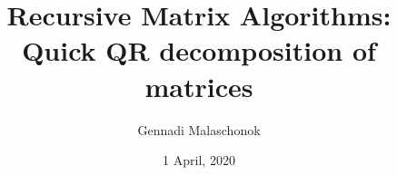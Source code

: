 \documentclass[pdf]{beamer}
\begin{document}
\newtheorem{sentence}{Sentence}
\newtheorem{follow}{Corollary}
\newtheorem{consequence}{Consequence}
\newcommand{\bP}{{\mathbf P}}
\newtheorem{myProperty}{Property}
\newcommand{\bQ}{{\mathbf Q}}
\newcommand{\bR}{{\mathbf R}}
\newcommand{\bL}{{\mathbf L}}
\newcommand{\bM}{{\mathbf M}}
\newcommand{\bU}{{\mathbf U}}
\newcommand{\bA}{{\mathbf A}}
\newcommand{\bB}{{\mathbf B}}
\newcommand{\bC}{{\mathbf C}}
\newcommand{\bD}{{\mathbf D}}
\newcommand{\bd}{{\mathbf d}}
\newcommand{\bl}{{\mathbf l}}
\newcommand{\bu}{{\mathbf u}}
\newcommand{\bp}{{\mathbf p}}
\newcommand{\bq}{{\mathbf q}}
\newcommand{\bm}{{\mathbf m}}
\newcommand{\bw}{{\mathbf w}}
\newcommand{\bW}{{\mathbf W}}


\newcommand{\Dmtr}[4]%
{\left|\begin{array}{rr}#1 & #2\\#3 & #4\end{array}\right|}
\def\cA{{\bf \mathcal A}}
\def\cB{{\bf \mathcal B}}
\def\cC{{\bf \mathcal C}}
\def\cD{{\bf \mathcal D}}
\newcommand{\LDU}{{\mathrm{LDU}}}
\newcommand{\Adj}{{\mathrm{Adj}}}
\newcommand{\diag}{{\mathrm{diag}}}
\newcommand{\rank}{{\mathrm{rank}}}
\def\al{{\alpha}}
\def\be{\beta}
\def\de{\delta}
\def\ve{\varepsilon}
\def\si{\sigma}
\def\ga{\gamma}
\def\di{{\bf {\rm diag}}}
\def\De{\Delta}
\def\G{\Gamma}
\def\cA{{\bf \mathcal A}}
\def\cU{{\bf \mathcal U}}
\def\cL{{\bf \mathcal L}}
\def\cH{{\bf \mathcal H}}
\def\cG{{\bf \mathcal G}}



\title{Recursive Matrix Algorithms: \\ Quick QR decomposition of matrices}
 
 

\author{Gennadi Malaschonok }


\date{1 April, 2020}



\frame{\titlepage}

 

\end{document}
